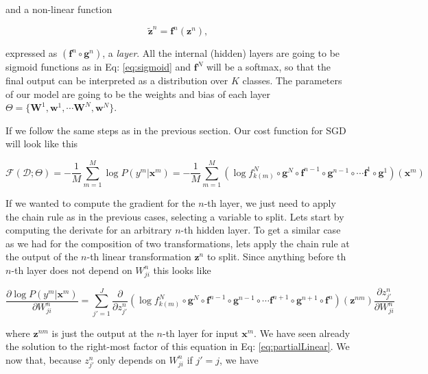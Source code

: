 \noindent and a non-linear function 

\begin{equation}
\tilde{\mathbf{z}}^n = \mathbf{f}^n(\mathbf{z}^n),
\end{equation}

expressed as $(\mathbf{f}^n \circ \mathbf{g}^n)$, a \textit{layer}. All the internal (hidden) layers are going to be sigmoid functions as in Eq: \ref{eq:sigmoid} and $\mathbf{f}^N$ will be a softmax, so that the final output can be interpreted as a distribution over $K$ classes. The parameters of our model are going to be the weights and bias of each layer $\Theta=\{\mathbf{W}^1, \mathbf{w}^1, \cdots \mathbf{W}^N, \mathbf{w}^N\}$.  

If we follow the same steps as in the previous section. Our cost function for SGD will look like this

\begin{equation}
\mathcal{F}(\mathcal{D};\Theta) = -\frac{1}{M}\sum_{m=1}^M \log P(y^m | \mathbf{x}^m) = -\frac{1}{M}\sum_{m=1}^M (\log f_{k(m)}^N \circ \mathbf{g}^N \circ \mathbf{f}^{n-1} \circ \mathbf{g}^{n-1} \circ \cdots \mathbf{f}^1 \circ \mathbf{g}^1)(\mathbf{x}^m)
\end{equation}

If we wanted to compute the gradient for the $n$-th layer, we just need to apply the chain rule as in the previous cases, selecting a variable to split. Lets start by computing the derivate for an arbitrary $n$-th hidden layer. To get a similar case as we had for the composition of two transformations, lets apply the chain rule at the output of the $n$-th linear transformation $\mathbf{z}^n$ to split. Since anything before th $n$-th layer does not depend on $W_{ji}^n$ this looks like  

\begin{equation}
\frac{\partial \log P(y^m | \mathbf{x}^m)}{\partial W_{ji}^n} = \sum_{j'=1}^J \frac{\partial}{\partial z^n_{j'}} (\log f_{k(m)}^N \circ \mathbf{g}^N \circ \mathbf{f}^{n-1} \circ \mathbf{g}^{n-1} \circ \cdots \mathbf{f}^{n+1} \circ \mathbf{g}^{n+1} \circ \mathbf{f}^{n})(\mathbf{z}^{nm})\frac{\partial z^n_{j'}}{\partial W_{ji}^n}
\label{eq:partialfn}
\end{equation}

where $\mathbf{z}^{nm}$ is just the output at the $n$-th layer for input $\mathbf{x}^{m}$. We have seen already the solution to the right-most factor of this equation in Eq: \ref{eq:partialLinear}. We now that, because $z^n_{j'}$ only depends on $W_{ji}^n$ if $j'=j$, we have 

